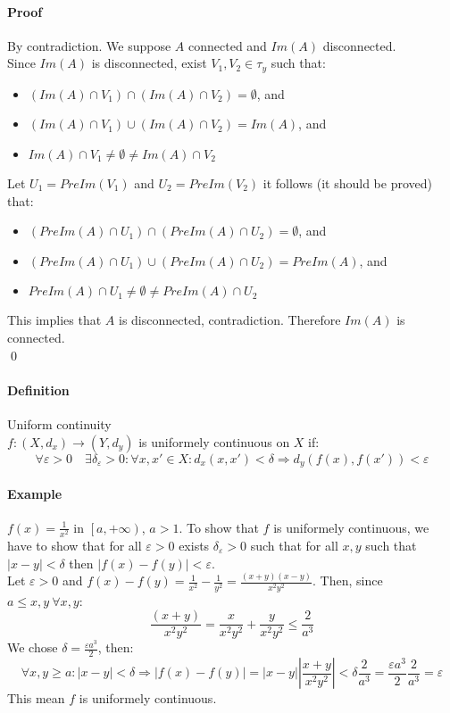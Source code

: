\documentclass{article}
\newcommand{\abs}[1]{\left|#1\right|}
\newcommand{\func}[3]{#1 : #2 \rightarrow #3}
\newcommand{\Ep}{\varepsilon}
\newcommand{\Def}{\paragraph{Definition}}
\newcommand{\Proof}{\paragraph{Proof}}
\newcommand{\Example}{\paragraph{Example}}
\begin{document}
  \Proof By contradiction. We suppose $A$ connected and $Im(A)$ disconnected.
\\Since $Im(A)$ is disconnected, exist $V_1, V_2 \in \tau_y$ such that:
  \begin{itemize}
    \item $(Im(A) \cap V_1) \cap (Im(A) \cap V_2) = \emptyset$, and
    \item $(Im(A) \cap V_1) \cup (Im(A) \cap V_2) = Im(A)$, and
    \item $Im(A) \cap V_1 \neq \emptyset \neq Im(A) \cap V_2$
  \end{itemize}
  Let $U_1 = PreIm(V_1)$ and $U_2 = PreIm(V_2)$ it follows (it should be proved)
  that:
  \begin{itemize}
    \item $(PreIm(A) \cap U_1) \cap (PreIm(A) \cap U_2) = \emptyset$, and
    \item $(PreIm(A) \cap U_1) \cup (PreIm(A) \cap U_2) = PreIm(A)$, and
    \item $PreIm(A) \cap U_1 \neq \emptyset \neq PreIm(A) \cap U_2$
  \end{itemize}
  This implies that $A$ is disconnected, contradiction. Therefore $Im(A)$ is
  connected.
\\\qed

  \Def Uniform continuity
\\$\func{f}{(X,d_x)}{(Y,d_y)}$ is uniformely continuous on $X$ if:
\begin{equation*}
  \forall \Ep > 0 \quad \exists \delta_\Ep > 0 : \forall x,x' \in X : d_x(x,x')
  < \delta \Rightarrow d_y(f(x),f(x')) < \Ep
\end{equation*}

  \Example $f(x) = \frac{1}{x^2}$ in $\left[a, +\infty\right)$, $a > 1$. To show
  that $f$ is uniformely continuous, we have to show that for all $\Ep > 0$
  exists $\delta_\Ep > 0$ such that for all $x,y$ such that $\abs{x-y} < \delta$
  then $\abs{f(x)-f(y)} < \Ep$.
\\Let $\Ep > 0$ and $f(x) - f(y) = \frac{1}{x^2} - \frac{1}{y^2} =
  \frac{(x+y)(x-y)}{x^2 y^2}$. Then, since $a \leq x,y \ \forall x,y$:
\begin{equation*}
  \frac{(x+y)}{x^2 y^2} = \frac{x}{x^2 y^2} + \frac{y}{x^2 y^2} \leq \frac{2}{a^3}
\end{equation*}
  We chose $\delta = \frac{\Ep a^3}{2}$, then:
\begin{equation*}
  \forall x,y \geq a : \abs{x-y} < \delta \Rightarrow \abs{f(x)-f(y)} =
  \abs{x-y} \abs{\frac{x+y}{x^2 y^2}} < \delta \frac{2}{a^3} =
  \frac{\Ep a^3}{2} \frac{2}{a^3} = \Ep
\end{equation*}
  This mean $f$ is uniformely continuous.
\end{document}
